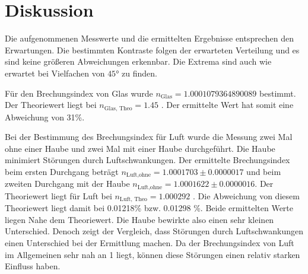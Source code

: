 \section{Diskussion}
\label{sec:Diskussion}
Die aufgenommenen Messwerte und die ermittelten Ergebnisse entsprechen den Erwartungen.
Die bestimmten Kontraste folgen der erwarteten Verteilung und es sind keine größeren Abweichungen erkennbar.
Die Extrema sind auch wie erwartet bei Vielfachen von $45°$ zu finden.

\noindent
Für den Brechungsindex von Glas wurde $n_\text{Glas} = 1.0001079364890089$ bestimmt.
Der Theoriewert liegt bei $n_\text{Glas, Theo} = 1.45$ \cite{Brechungsindex}.
Der ermittelte Wert hat somit eine Abweichung von 31\%.

\noindent
Bei der Bestimmung des Brechungsindex für Luft wurde die Messung zwei Mal ohne einer Haube und zwei Mal mit einer Haube durchgeführt.
Die Haube minimiert Störungen durch Luftschwankungen.
Der ermittelte Brechungsindex beim ersten Durchgang beträgt $n_\text{Luft,ohne} = 1.0001703 \pm 0.0000017 $ und beim zweiten Durchgang mit der Haube $n_\text{Luft,ohne} =  1.0001622 \pm 0.0000016 $.
Der Theoriewert liegt für Luft bei $n_\text{Luft, Theo} = 1.000 292$ \cite{Brechungsindex}.
Die Abweichung von diesem Theoriewert liegt damit bei 0.01218\% bzw. 0.01298 \%.
Beide ermittelten Werte liegen Nahe dem Theoriewert.
Die Haube bewirkte also einen sehr kleinen Unterschied.
Denoch zeigt der Vergleich, dass Störungen durch Luftschwankungen einen Unterschied bei der Ermittlung machen.
Da der Brechungsindex von Luft im Allgemeinen sehr nah an 1 liegt, können diese Störungen einen relativ starken Einfluss haben.